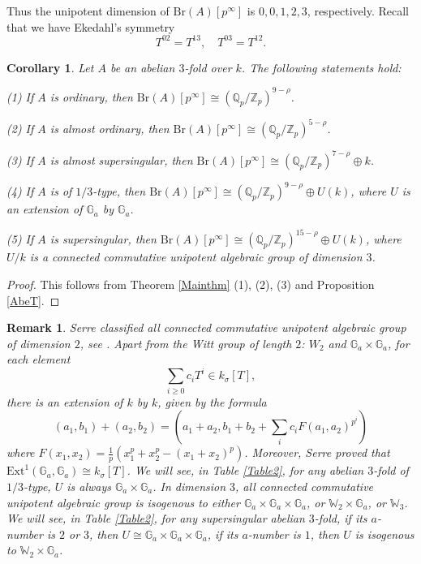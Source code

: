 \documentclass[a4paper,12pt,twoside]{report}
\newtheorem{corollary}[theorem]{Corollary}
\newtheorem{remark}[theorem]{Remark}
\newcommand{\Q}{\mathbb{Q}}
\newcommand{\Z}{\mathbb{Z}}
\newcommand{\G}{\mathbb{G}}
\newcommand{\Br}{\mathrm{Br}}
\newcommand{\W}{\mathbb{W}}
\begin{document}
Thus the unipotent dimension of $\Br(A)[p^{\infty}]$ is $0,0,1,2,3$, respectively. Recall that we have Ekedahl's symmetry
\[T^{02}=T^{13}, \quad T^{03}=T^{12}.\]

\begin{corollary} Let \(A\) be an abelian \(3\)-fold over \(k\). The following statements hold:

{\rm  (1)} If $A$ is ordinary, 
    then $\Br(A)[p^{\infty}]\cong (\Q_p/\Z_p)^{9-\rho}$. 
    
{\rm  (2)} If $A$ is almost ordinary, 
    then $\Br(A)[p^{\infty}]\cong (\Q_p/\Z_p)^{5-\rho}$. 

{\rm  (3)} If $A$ is almost supersingular, 
    then $\Br(A)[p^{\infty}]\cong (\Q_p/\Z_p)^{7-\rho}\oplus k$.

{\rm  (4)} If $A$ is of $1/3$-type,
    then $\Br(A)[p^{\infty}]\cong (\Q_p/\Z_p)^{9-\rho}\oplus U(k)$,
    where $U$ is an extension of $\G_a$ by $\G_a$.

{\rm  (5)} If $A$ is supersingular, 
    then $\Br(A)[p^{\infty}]\cong (\Q_p/\Z_p)^{15-\rho}\oplus U(k)$,
    where $U/k$ is a connected commutative unipotent algebraic group of dimension $3$.
\end{corollary}
\begin{proof} This follows from Theorem \ref{Mainthm} (1), (2), (3) and Proposition \ref{AbeT}. \end{proof}

\begin{remark} {\rm
    Serre classified all connected commutative unipotent algebraic group of dimension $2$, see \cite[Lemme VII.2.9.3]{Se2}. 
    Apart from the Witt group of length $2$: $W_2$ and $\G_a\times \G_a$, 
    for each element \[\sum_{i\geq 0} c_i T^i\in k_{\sigma}[T],\] there is an extension of $k$ by $k$, given by the formula 
    \begin{equation}
        (a_1,b_1)+(a_2,b_2)=(a_1+a_2, b_1+b_2+\sum_{i} c_i F(a_1,a_2)^{p^i})
    \end{equation}
    where $F(x_1,x_2)=\frac{1}{p}(x_1^p+x_2^p-(x_1+x_2)^p)$. 
Moreover, Serre proved that $\mathrm{Ext}^1(\G_a,\G_a)\cong k_{\sigma}[T]$. 
We will see, in Table \ref{Table2}, for any abelian $3$-fold of $1/3$-type, $U$ is always $\G_a\times \G_a$. 
In dimension $3$, all connected commutative unipotent algebraic group is isogenous to either $\G_a\times \G_a\times \G_a$, or $\W_2\times \G_a$, or $\W_3$. 
We will see, in Table \ref{Table2}, for any supersingular abelian $3$-fold, if its $a$-number is $2$ or $3$, then $U\cong \G_a\times \G_a\times \G_a$, 
if its $a$-number is $1$, then $U$ is isogenous to $\W_2\times \G_a$. 
}
\end{remark}
\end{document}
